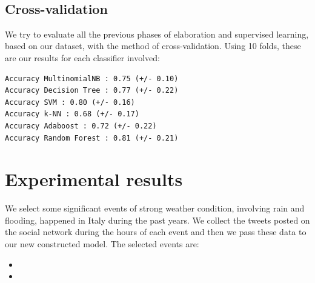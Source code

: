 \documentclass[a4paper]{article}
\begin{document}
\begin{figure}[b]
 \\
\caption{}
\label{fig:confusion_matrices}
\end{figure}

\subsection{Cross-validation}
We try to evaluate all the previous phases of elaboration and supervised learning, based on our dataset, with the method of cross-validation. Using 10 folds, these are our results for each classifier involved:

\begin{verbatim}
Accuracy MultinomialNB : 0.75 (+/- 0.10)
Accuracy Decision Tree : 0.77 (+/- 0.22)
Accuracy SVM : 0.80 (+/- 0.16)
Accuracy k-NN : 0.68 (+/- 0.17)
Accuracy Adaboost : 0.72 (+/- 0.22)
Accuracy Random Forest : 0.81 (+/- 0.21)
\end{verbatim}

\section{Experimental results}
We select some significant events of strong weather condition, involving rain and flooding, happened in Italy during the past years. We collect the tweets posted on the social network during the hours of each event and then we pass these data to our new constructed model. The selected events are:
\begin{itemize}
\item 
\item
\end{itemize}
\end{document}

